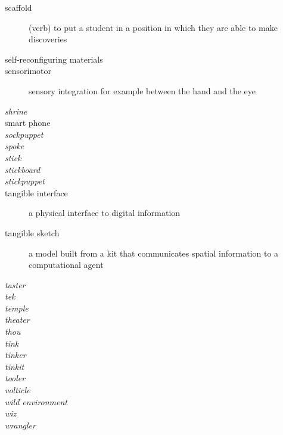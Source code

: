 \begin{description}
%
\item[scaffold] (verb) to put a student in a position in which they are able to make discoveries
%
\item[self-reconfiguring materials]
%
\item[sensorimotor] sensory integration for example between the hand and the eye
%
\item[\emph{shrine}]
%
\item[smart phone]
%
\item[\emph{sockpuppet}]
%
\item[\emph{spoke}]
%
\item[\emph{stick}]
%
\item[\emph{stickboard}]
%
\item[\emph{stickpuppet}]
%
\item[tangible interface] a physical interface to digital information
%
\item[tangible sketch] a model built from a kit that communicates spatial information to a computational agent
%
\item[\emph{taster}]
%
\item[\emph{tek}]
%
\item[\emph{temple}]
%
\item[\emph{theater}]
%
\item[\emph{thou}]
%
\item[\emph{tink}]
%
\item[\emph{tinker}]
%
\item[\emph{tinkit}]
%
\item[\emph{tooler}]
%
\item[\emph{volticle}]
%
\item[\emph{wild environment}]
%
\item[\emph{wiz}]
%
\item[\emph{wrangler}]
%
\end{description}

